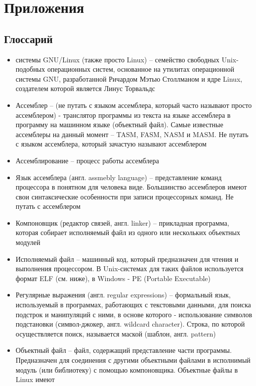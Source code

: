 \documentclass[a4paper]{article}
\begin{document}
\pagebreak
\section{Приложения}
	\subsection{Глоссарий}
	\begin{itemize}
		\item системы GNU/Linux (также просто Linux) -- семейство
			свободных Unix-подобных операционных систем, основанное
			на утилитах операционной системы GNU, разработанной
			Ричардом Мэтью Столлманом и ядре Linux, создателем
			которой является Линус Торвальдс
		\item Ассемблер -- (не путать с языком ассемблера, который часто
			называют просто ассемблером) - транслятор программы из
			текста на языке ассемблера в программу на машинном
			языке (объектный файл). Самые известные ассемблеры на
			данный момент -- TASM, FASM, NASM и MASM. Не путать с
			языком ассемблера, который зачастую называют ассемблером
		\item Ассемблирование -- процесс работы ассемблера
		\item Язык ассемблера (англ. assmebly language) -- представление
			команд процессора в понятном для человека виде.
			Большинство ассемблеров имеют свои синтаксические
			особенности при записи процессорных команд. Не путать с
			ассемблером
		\item Компоновщик (редактор связей, англ. linker) -- прикладная
			программа, которая собирает исполняемый файл из одного
			или нескольких объектных модулей
		\item Исполняемый файл -- машинный код, который предназначен
			для чтения и выполнения процессором. В Unix-системах
			для таких файлов используется формат ELF (см. ниже), в
			Windows - PE (Portable Executable)
		\item Регулярные выражения (англ. regular expressions) --
			формальный язык, используемый в программах, работающих с
			текстовыми данными, для поиска подстрок и манипуляций с
			ними, в основе которого - использование символов
			подстановки (символ-джокер, англ. wildcard character).
			Строка, по которой осуществляется поиск, называется
			маской (шаблон, англ. pattern)
		\item Объектный файл -- файл, содержащий представление части
			программы. Предназначен для соединения с другими
			объектными файлами в исполнимый модуль (или библиотеку)
			с помощью компоновщика. Объектные файлы в Linux имеют

\end{itemize}
\end{document}

